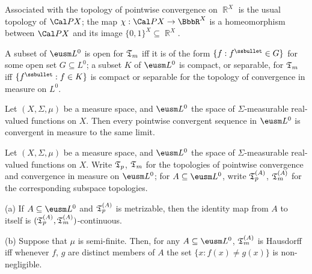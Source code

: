 Associated with the topology of pointwise convergence on $\BbbR^X$ is
the usual topology of $\Cal PX$;  the map
$\chi:\Cal PX\to\BbbR^X$ is a homeomorphism between $\Cal PX$ and its
image $\{0,1\}^X\subseteq\BbbR^X$.

   A subset of
$\eusm L^0$ is open for $\frak T_m$ iff it is of the form
$\{f:f^{\ssbullet}\in G\}$ for some open set $G\subseteq L^0$;
 a
subset $K$ of $\eusm L^0$ is compact, or separable, for $\frak T_m$ iff
$\{f^{\ssbullet}:f\in K\}$ is compact or separable for the topology of
convergence in measure on $L^0$.


 Let $(X,\Sigma,\mu)$ be a measure space, and
$\eusm L^0$ the space of $\Sigma$-measurable real-valued functions on
$X$.   Then every pointwise convergent sequence in $\eusm L^0$ is
convergent in measure to the same limit.


 Let
$(X,\Sigma,\mu)$ be a measure space, and $\eusm L^0$ the space of
$\Sigma$-measurable real-valued functions on $X$.   Write $\frak T_p$,
$\frak T_m$ for the topologies of pointwise convergence and convergence
in measure on $\eusm L^0$;  for $A\subseteq\eusm L^0$, write
$\frak T_p^{(A)}$, $\frak T_m^{(A)}$ for the corresponding subspace
topologies.

(a) If $A\subseteq\eusm L^0$ and $\frak T_p^{(A)}$ is metrizable, then the
identity map from $A$ to itself is
$(\frak T_p^{(A)},\frak T_m^{(A)})$-continuous.

(b) Suppose that $\mu$ is semi-finite.   Then, for any
$A\subseteq\eusm L^0$, $\frak T_m^{(A)}$ is Hausdorff iff whenever $f$, $g$
are distinct
members of $A$ the set $\{x:f(x)\ne g(x)\}$ is non-negligible.

